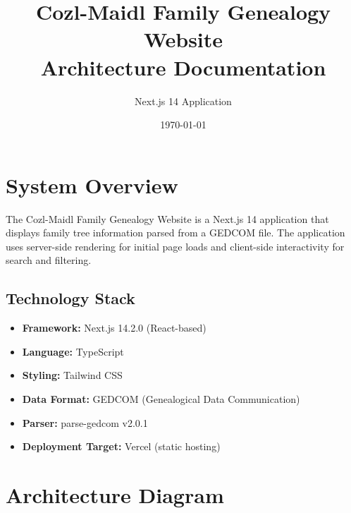 \documentclass[11pt]{article}
\title{Cozl-Maidl Family Genealogy Website\\Architecture Documentation}
\author{Next.js 14 Application}
\date{\today}
\begin{document}
\maketitle
\tableofcontents
\newpage

\section{System Overview}

The Cozl-Maidl Family Genealogy Website is a Next.js 14 application that displays family tree information parsed from a GEDCOM file. The application uses server-side rendering for initial page loads and client-side interactivity for search and filtering.

\subsection{Technology Stack}
\begin{itemize}
    \item \textbf{Framework:} Next.js 14.2.0 (React-based)
    \item \textbf{Language:} TypeScript
    \item \textbf{Styling:} Tailwind CSS
    \item \textbf{Data Format:} GEDCOM (Genealogical Data Communication)
    \item \textbf{Parser:} parse-gedcom v2.0.1
    \item \textbf{Deployment Target:} Vercel (static hosting)
\end{itemize}

\section{Architecture Diagram}
\end{document}
